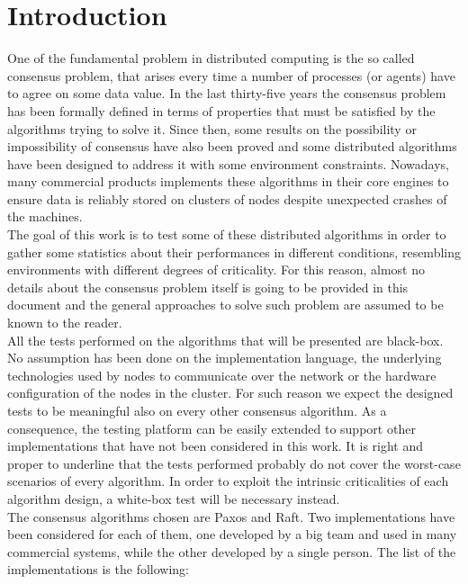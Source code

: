 \chapter{Introduction}\label{chp:introduction}

One of the fundamental problem in distributed computing is the so called consensus problem, that arises every time a number of processes (or agents) have to agree on some data value. In the last thirty-five years the consensus problem has been formally defined in terms of properties that must be satisfied by the algorithms trying to solve it. Since then, some results on the possibility or impossibility of consensus have also been proved and some distributed algorithms have been designed to address it with some environment constraints. Nowadays, many commercial products implements these algorithms in their core engines to ensure data is reliably stored on clusters of nodes despite unexpected crashes of the machines.\\
The goal of this work is to test some of these distributed algorithms in order to gather some statistics about their performances in different conditions, resembling environments with different degrees of criticality. For this reason, almost no details about the consensus problem itself is going to be provided in this document and the general approaches to solve such problem are assumed to be known to the reader.\\
All the tests performed on the algorithms that will be presented are black-box. No assumption has been done on the implementation language, the underlying technologies used by nodes to communicate over the network or the hardware configuration of the nodes in the cluster. For such reason we expect the designed tests to be meaningful also on every other consensus algorithm. As a consequence, the testing platform can be easily extended to support other implementations that have not been considered in this work. It is right and proper to underline that the tests performed probably do not cover the worst-case scenarios of every algorithm. In order to exploit the intrinsic criticalities of each algorithm design, a white-box test will be necessary instead.\\
The consensus algorithms chosen are Paxos and Raft. Two implementations have been considered for each of them, one developed by a big team and used in many commercial systems, while the other developed by a single person. The list of the implementations is the following:

